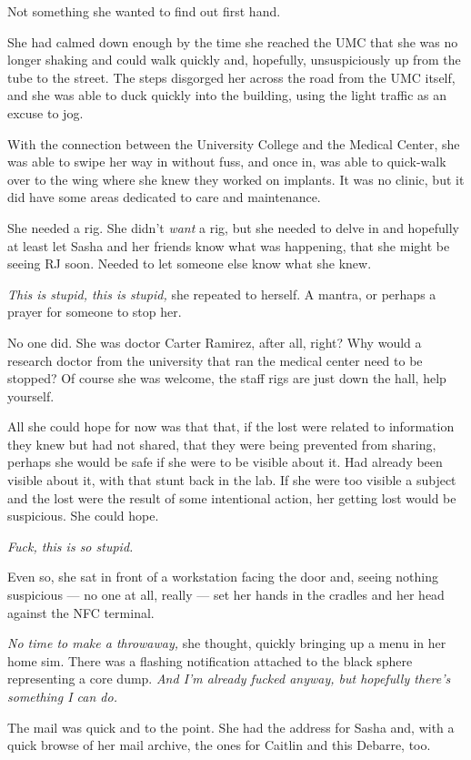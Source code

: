 Not something she wanted to find out first hand.

She had calmed down enough by the time she reached the UMC that she was no longer shaking and could walk quickly and, hopefully, unsuspiciously up from the tube to the street. The steps disgorged her across the road from the UMC itself, and she was able to duck quickly into the building, using the light traffic as an excuse to jog.

With the connection between the University College and the Medical Center, she was able to swipe her way in without fuss, and once in, was able to quick-walk over to the wing where she knew they worked on implants. It was no clinic, but it did have some areas dedicated to care and maintenance.

She needed a rig. She didn't \emph{want} a rig, but she needed to delve in and hopefully at least let Sasha and her friends know what was happening, that she might be seeing RJ soon. Needed to let someone else know what she knew.

\emph{This is stupid, this is stupid,} she repeated to herself. A mantra, or perhaps a prayer for someone to stop her.

No one did. She was doctor Carter Ramirez, after all, right? Why would a research doctor from the university that ran the medical center need to be stopped? Of course she was welcome, the staff rigs are just down the hall, help yourself.

All she could hope for now was that that, if the lost were related to information they knew but had not shared, that they were being prevented from sharing, perhaps she would be safe if she were to be visible about it. Had already been visible about it, with that stunt back in the lab. If she were too visible a subject and the lost were the result of some intentional action, her getting lost would be suspicious. She could hope.

\emph{Fuck, this is so stupid.}

Even so, she sat in front of a workstation facing the door and, seeing nothing suspicious — no one at all, really — set her hands in the cradles and her head against the NFC terminal.

\emph{No time to make a throwaway,} she thought, quickly bringing up a menu in her home sim. There was a flashing notification attached to the black sphere representing a core dump. \emph{And I'm already fucked anyway, but hopefully there's something I can do.}

The mail was quick and to the point. She had the address for Sasha and, with a quick browse of her mail archive, the ones for Caitlin and this Debarre, too.

